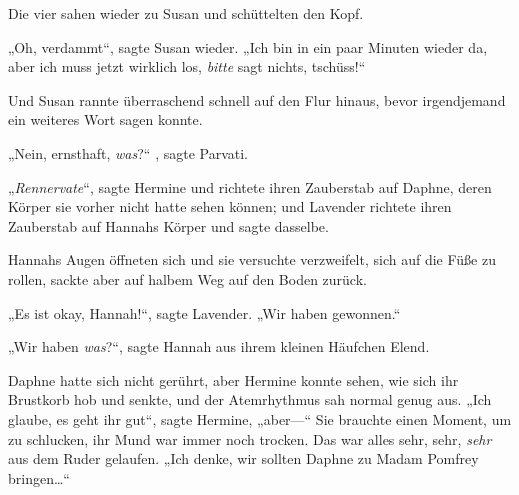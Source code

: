 Die vier sahen wieder zu Susan und schüttelten den Kopf.

„Oh, verdammt“, sagte Susan wieder. „Ich bin in ein paar Minuten wieder da, aber ich muss jetzt wirklich los, \emph{bitte} sagt nichts, tschüss!“

Und Susan rannte überraschend schnell auf den Flur hinaus, bevor irgendjemand ein weiteres Wort sagen konnte.

„Nein, ernsthaft, \emph{was}?“ , sagte Parvati.

„\emph{Rennervate}“, sagte Hermine und richtete ihren Zauberstab auf Daphne, deren Körper sie vorher nicht hatte sehen können; und Lavender richtete ihren Zauberstab auf Hannahs Körper und sagte dasselbe.

Hannahs Augen öffneten sich und sie versuchte verzweifelt, sich auf die Füße zu rollen, sackte aber auf halbem Weg auf den Boden zurück.

„Es ist okay, Hannah!“, sagte Lavender. „Wir haben gewonnen.“

„Wir haben \emph{was}?“, sagte Hannah aus ihrem kleinen Häufchen Elend.

Daphne hatte sich nicht gerührt, aber Hermine konnte sehen, wie sich ihr Brustkorb hob und senkte, und der Atemrhythmus sah normal genug aus. „Ich glaube, es geht ihr gut“, sagte Hermine, „aber—“ Sie brauchte einen Moment, um zu schlucken, ihr Mund war immer noch trocken. Das war alles sehr, sehr, \emph{sehr} aus dem Ruder gelaufen. „Ich denke, wir sollten Daphne zu Madam Pomfrey bringen…“

